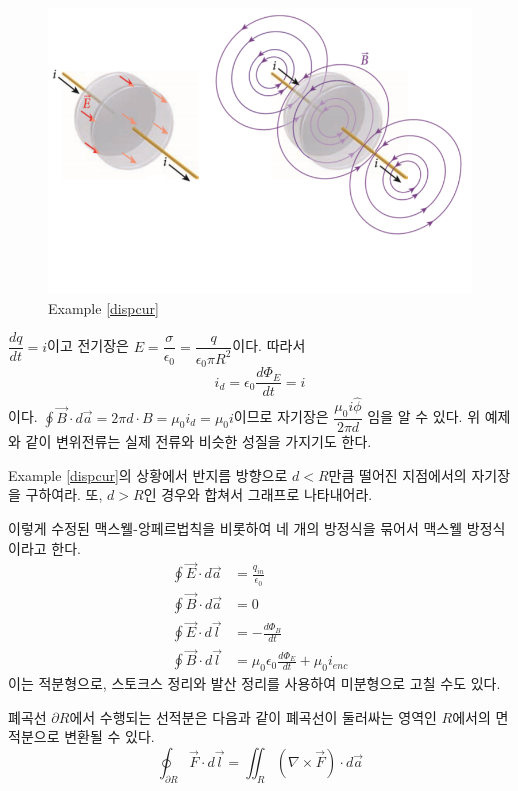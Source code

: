 \begin{figure}[h]
\centering\includegraphics[scale=0.4]{Pictures/dispcur.PNG}
\caption{Example \ref{dispcur}}
\label{fig:dispcur}
\end{figure}
$\dfrac{dq}{dt}=i$이고 전기장은 $E=\dfrac{\sigma}{\epsilon_0}=\dfrac{q}{\epsilon_0\pi R^2}$이다. 따라서  
\begin{equation}
i_d=\epsilon_0\frac{d\Phi_E}{dt}=i
\end{equation}
이다. $\oint \vec{B}\cdot d\vec{a}=2\pi d \cdot B=\mu_0 i_d=\mu_0 i$이므로 자기장은 $\dfrac{\mu_0 i \hat{\phi}}{2\pi d}$ 임을 알 수 있다.
위 예제와 같이 변위전류는 실제 전류와 비슷한 성질을 가지기도 한다. 
\begin{exercise}
Example \ref{dispcur}의 상황에서 반지름 방향으로 $d<R$만큼 떨어진 지점에서의 자기장을 구하여라. 또, $d>R$인 경우와 합쳐서 그래프로 나타내어라.
\end{exercise}
이렇게 수정된 맥스웰-앙페르법칙을 비롯하여 네 개의 방정식을 묶어서 맥스웰 방정식이라고 한다.
\begin{align}
\oint \vec{E}\cdot d\vec{a}&=\frac{q_{in}}{\epsilon_0}\\
\oint \vec{B}\cdot d\vec{a}&=0\\
\oint \vec{E}\cdot d\vec{l}&=-\frac{d\Phi_B}{dt}\\
\oint \vec{B}\cdot d\vec{l}&=\mu_0\epsilon_0 \frac{d\Phi_E}{dt}+\mu_0 i_{enc}
\end{align}
이는 적분형으로, 스토크스 정리와 발산 정리를 사용하여 미분형으로 고칠 수도 있다.
\begin{theorem}[스토크스 정리]
폐곡선 $\partial R$에서 수행되는 선적분은 다음과 같이 폐곡선이 둘러싸는 영역인 $R$에서의 면적분으로 변환될 수 있다.
\begin{equation}
\oint_{\partial R} \vec{F}\cdot d\vec{l}=\iint_R (\nabla \times \vec{F}) \cdot d\vec{a}
\end{equation}
\end{theorem}
